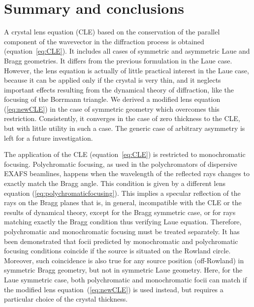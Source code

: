 \documentclass[preprint]{iucr}              %
\newcommand{\inblue}[1]{{\color{blue}#1}}
\begin{document}
\section{Summary and conclusions}
\label{sec:summary}
\inblue{A crystal lens equation (CLE) based on the conservation of the parallel component of the wavevector in the diffraction process is obtained (equation~\ref{eq:CLE}). It includes all cases of symmetric and asymmetric Laue and Bragg geometries. It differs from the previous formulation \cite{CK} in the Laue case. However, the lens equation is actually of little practical interest in the Laue case, because it can be applied only if the crystal is very thin, and it neglects important effects resulting from the dynamical theory of diffraction, like the focusing of the Borrmann triangle. We derived a modified lens equation (\ref{eq:newCLE}) in the case of symmetric geometry which overcomes this restriction. Consistently, it converges in the case of zero thickness to the CLE, but with little utility in such a case. The generic case of arbitrary asymmetry is left for a future investigation.

The application of the CLE (equation~\ref{eq:CLE}) is restricted to monochromatic focusing. Polychromatic focusing, as used in the polychromators of dispersive EXAFS beamlines, happens when the wavelength of the reflected rays changes to exactly match the Bragg angle. This condition is given by a different lens equation (\ref{eq:polychromaticfocusing}). This implies a specular reflection of the rays on the Bragg planes that is, in general, incompatible with the CLE or the results of dynamical theory, except for the Bragg symmetric case, or for rays matching exactly the Bragg condition thus verifying Laue equation. Therefore, polychromatic and monochromatic focusing must be treated separately. It has been demonstrated that focii predicted by monochromatic and polychromatic focusing conditions coincide if the source is situated on the Rowland circle. Moreover, such coincidence is also true for any source position (off-Rowland) in symmetric Bragg geometry, but not in symmetric Laue geometry. Here, for the Laue symmetric case, both polychromatic and monochromatic focii can match if the modified lens equation~(\ref{eq:newCLE}) is used instead, but requires a particular choice of the crystal thickness.

}
\end{document}
